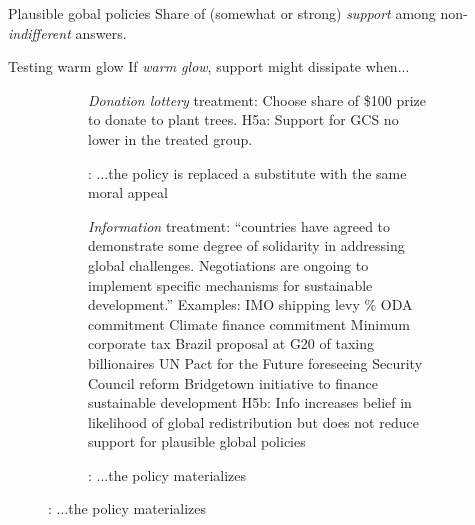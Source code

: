 \documentclass[aspectratio=169,xcolor=dvipsnames, 11pt,mathserif]{beamer}
\begin{document}
\begin{frame}{Plausible gobal policies\label{solidarity_support_relative}}
\centering Share of (somewhat or strong) \textit{support} among non-\textit{indifferent} answers. \quad {} \hyperlink{solidarity_support_absolute}{} \\
\end{frame}

\begin{frame}{Testing warm glow} 
  \centering If \textit{warm glow}, support might dissipate when...
    \begin{figure}
\begin{subfigure}{.38\textwidth}
  \caption[]{\normalsize {}: ...the policy is replaced a substitute with the same moral appeal}
  \bbvs \ip \textit{Donation lottery} treatment: Choose share of \$100 prize to donate to plant trees.
  \ip H5a: Support for GCS no lower in the treated group.
  \ee
  \vspace{3.8cm}
\end{subfigure} \quad \pause
\begin{subfigure}{.59\textwidth}
  \caption[]{\normalsize {}: ...the policy materializes}
  \bbvs \ip \textit{Information} treatment: ``countries have agreed to demonstrate some degree of solidarity in addressing global challenges.  Negotiations are ongoing to implement specific mechanisms for sustainable development.'' Examples:
  \bbvs \ip IMO shipping levy
  \% ODA commitment
  \ip Climate finance commitment
  \ip Minimum corporate tax
  \ip Brazil proposal at G20 of taxing billionaires
  \ip UN Pact for the Future foreseeing Security Council reform
  \ip Bridgetown initiative to finance sustainable development
  \ee
  \ip H5b: Info increases belief in likelihood of global redistribution but does not reduce support for plausible global policies
  \ee
\end{subfigure}
\end{figure}
\end{frame}
\end{document}
